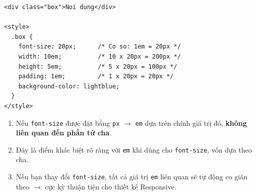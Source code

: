 \documentclass[11pt,oneside]{book}
\newcommand{\thd}[1]{\textcolor{white}{\textbf{\strut #1}}}
\newcommand{\codeinline}[1]{\textcolor{accentOrange}{\texttt{#1}}}
\begin{document}
\begin{codeWindow}
\begin{lstlisting}[language=HTML5]
<div class="box">Noi dung</div>

<style>
  .box {
    font-size: 20px;      /* Co so: 1em = 20px */
    width: 10em;          /* 10 x 20px = 200px */
    height: 5em;          /* 5 x 20px = 100px */
    padding: 1em;         /* 1 x 20px = 20px */
    background-color: lightblue;
  }
</style>
\end{lstlisting}
\end{codeWindow}

\begin{prettyTableBox}
\sffamily\small
{}
\end{prettyTableBox}

\begin{noteBox}
\begin{enumerate}[leftmargin=1.5em, itemsep=2pt, parsep=0pt]
    \item Nếu \codeinline{font-size} được đặt bằng \codeinline{px} $\rightarrow$ \codeinline{em} dựa trên chính giá trị đó, \textbf{không liên quan đến phần tử cha}.
    \item Đây là điểm khác biệt rõ ràng với \codeinline{em} khi dùng cho \codeinline{font-size}, vốn dựa theo cha.
    \item Nếu bạn thay đổi \codeinline{font-size}, tất cả giá trị \codeinline{em} liên quan sẽ tự động co giãn theo $\rightarrow$ cực kỳ thuận tiện cho thiết kế Responsive.
\end{enumerate}
\end{noteBox}
\end{document}
